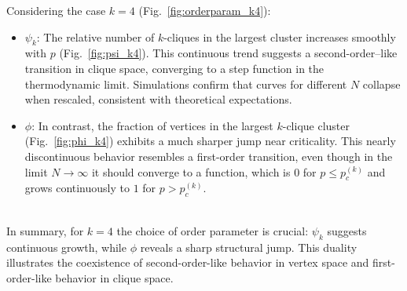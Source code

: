 Considering the case $k=4$ (Fig.~\ref{fig:orderparam_k4}):
\begin{itemize}
\item $\psi_k$:  
The relative number of $k$-cliques in the largest cluster increases smoothly with $p$ (Fig.~\ref{fig:psi_k4}).  
This continuous trend suggests a second-order–like transition in clique space, converging to a step function in the thermodynamic limit.
Simulations confirm that curves for different $N$ collapse when rescaled, consistent with theoretical expectations.

\item $\phi$:  
In contrast, the fraction of vertices in the largest $k$-clique cluster (Fig.~\ref{fig:phi_k4}) exhibits a much sharper jump near criticality.  
This nearly discontinuous behavior resembles a first-order transition, even though in the limit $N \to \infty$ it should converge to a function, which is $0$ for $p \leq p_c^{(k)}$ and grows continuously to $1$ for $p > p_c^{(k)}$.

\end{itemize}\\
In summary, for $k=4$ the choice of order parameter is crucial:  
$\psi_k$ suggests continuous growth, while $\phi$ reveals a sharp structural jump.  
This duality illustrates the coexistence of second-order-like behavior in vertex space and first-order-like behavior in clique space.

